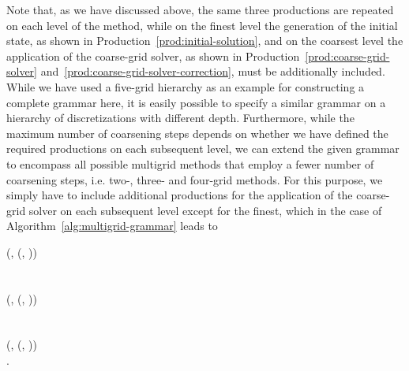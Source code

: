 Note that, as we have discussed above, the same three productions are repeated on each level of the method, while on the finest level the generation of the initial state, as shown in Production~\eqref{prod:initial-solution}, and on the coarsest level the application of the coarse-grid solver, as shown in Production~\eqref{prod:coarse-grid-solver} and~\eqref{prod:coarse-grid-solver-correction}, must be additionally included.
While we have used a five-grid hierarchy as an example for constructing a complete grammar here, it is easily possible to specify a similar grammar on a hierarchy of discretizations with different depth.
Furthermore, while the maximum number of coarsening steps depends on whether we have defined the required productions on each subsequent level, we can extend the given grammar to encompass all possible multigrid methods that employ a fewer number of coarsening steps, i.e. two-, three- and four-grid methods.
For this purpose, we simply have to include additional productions for the application of the coarse-grid solver on each subsequent level except for the finest, which in the case of Algorithm~\ref{alg:multigrid-grammar} leads to
\begin{bnf*}
	 {
		(, \bnfsp {}(, \bnfsp{}))
	} \\
	 \\ \\
	 {
		(, \bnfsp {}(, \bnfsp{}))
	} \\
	 \\ \\
	 {
		(, \bnfsp {}(, \bnfsp{}))
	} \\
	.
\end{bnf*}

